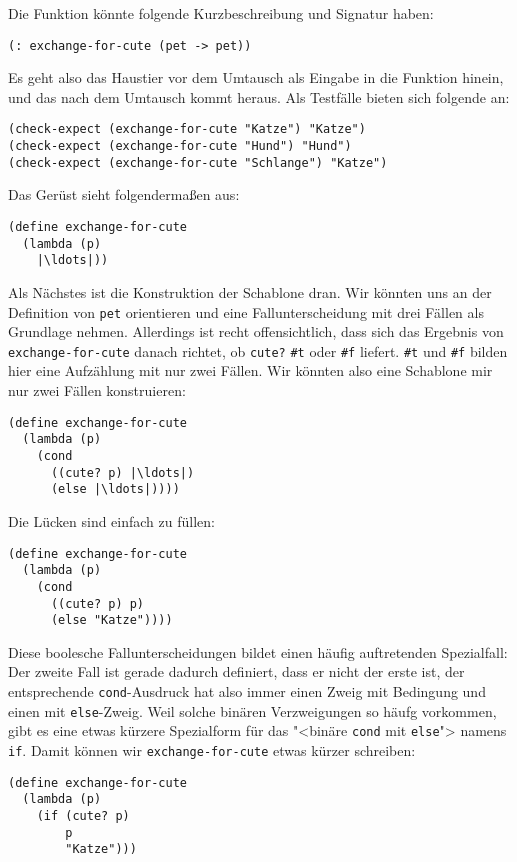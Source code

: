 Die Funktion könnte folgende Kurzbeschreibung und Signatur
haben:
%
\begin{lstlisting}
(: exchange-for-cute (pet -> pet))
\end{lstlisting}
%
Es geht also das Haustier vor dem Umtausch als Eingabe in die Funktion
hinein, und das nach dem Umtausch kommt heraus.  Als Testfälle bieten
sich folgende an:
%
\begin{lstlisting}
(check-expect (exchange-for-cute "Katze") "Katze")
(check-expect (exchange-for-cute "Hund") "Hund")
(check-expect (exchange-for-cute "Schlange") "Katze")
\end{lstlisting}
%
Das Gerüst sieht folgendermaßen aus:
%
\begin{lstlisting}
(define exchange-for-cute
  (lambda (p)
    |\ldots|))
\end{lstlisting}
%
Als Nächstes ist die Konstruktion der Schablone dran.  Wir könnten uns
an der Definition von \lstinline{pet} orientieren und eine
Fallunterscheidung mit drei Fällen als Grundlage nehmen.  Allerdings
ist recht offensichtlich, dass sich das Ergebnis von
\lstinline{exchange-for-cute} danach richtet, ob \lstinline{cute?} \lstinline{#t}
oder \lstinline{#f} liefert.   \lstinline{#t} und \lstinline{#f} bilden hier eine
Aufzählung mit nur zwei Fällen.  Wir könnten also eine Schablone mir
nur zwei Fällen konstruieren:
%
\begin{lstlisting}
(define exchange-for-cute
  (lambda (p)
    (cond
      ((cute? p) |\ldots|)
      (else |\ldots|))))
\end{lstlisting}
%
Die Lücken sind einfach zu füllen:
%
\begin{lstlisting}
(define exchange-for-cute
  (lambda (p)
    (cond
      ((cute? p) p)
      (else "Katze"))))
\end{lstlisting}
%
Diese boolesche Fallunterscheidungen bildet einen häufig auftretenden
Spezialfall: Der zweite Fall ist gerade dadurch definiert, dass er
nicht der erste ist, der entsprechende \lstinline{cond}-Ausdruck hat also
immer einen Zweig mit Bedingung und einen mit \lstinline{else}-Zweig.
Weil solche binären Verzweigungen so häufg vorkommen, gibt es eine
etwas kürzere Spezialform für das "<binäre \lstinline{cond} mit
\lstinline{else}"> namens \lstinline{if}.  Damit
können wir \lstinline{exchange-for-cute} etwas kürzer schreiben:
%
\begin{lstlisting}
(define exchange-for-cute
  (lambda (p)
    (if (cute? p)
        p
        "Katze")))
\end{lstlisting}
